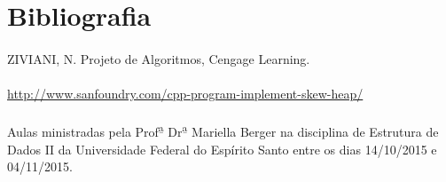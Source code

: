 \documentclass[12pt,a4paper]{article}
\begin{document}
 \newpage
 \section{Bibliografia}
  {\paragraph{} ZIVIANI, N. Projeto de Algoritmos, Cengage Learning.}
  {\paragraph{} \url{http://www.sanfoundry.com/cpp-program-implement-skew-heap/}}
  {\paragraph{} Aulas ministradas pela Prof\textsuperscript{\b a} Dr\textsuperscript{\b a} Mariella Berger na disciplina de Estrutura de Dados II da Universidade Federal do Espírito Santo entre os dias 14/10/2015 e 04/11/2015. }
 
\end{document}

